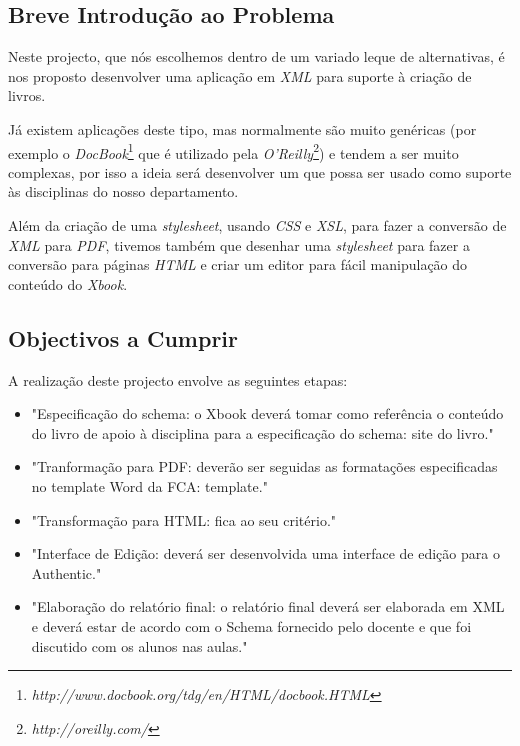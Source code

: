 \documentclass[a4paper]{article}
\begin{document}
\subsection{\large Breve Introdução ao Problema}

\hspace{1cm}Neste projecto, que nós escolhemos dentro de um variado leque de alternativas, é nos proposto desenvolver uma aplicação em {\em XML} para suporte à criação de livros.

\hspace{1cm}Já existem aplicações deste tipo, mas normalmente são muito genéricas (por exemplo o {\em DocBook}\footnote{{\em http://www.docbook.org/tdg/en/HTML/docbook.HTML}} que é utilizado pela {\em O'Reilly}\footnote{{\em http://oreilly.com/}}) e tendem a ser muito complexas, por isso a ideia será desenvolver um que possa ser usado como suporte às disciplinas do nosso departamento.

\hspace{1cm}Além da criação de uma {\em stylesheet}, usando {\em CSS} e {\em XSL}, para fazer a conversão de {\em XML} para {\em PDF}, tivemos também que desenhar uma {\em stylesheet} para fazer a conversão para páginas {\em HTML} e criar um editor para fácil manipulação do conteúdo do {\em Xbook}.\\

\subsection{Objectivos a Cumprir}

A realização deste projecto envolve as seguintes etapas:\\

\begin{itemize}
\item "Especificação do schema: o Xbook deverá tomar como referência o conteúdo do livro de apoio à disciplina para a especificação do schema: site do livro."
\item "Tranformação para PDF: deverão ser seguidas as formatações especificadas no template Word da FCA: template."
\item "Transformação para HTML: fica ao seu critério."
\item "Interface de Edição: deverá ser desenvolvida uma interface de edição para o Authentic."
\item "Elaboração do relatório final: o relatório final deverá ser elaborada em XML e deverá estar de acordo com o Schema fornecido pelo docente e que foi discutido com os alunos nas aulas."
\end{itemize}
\end{document}
